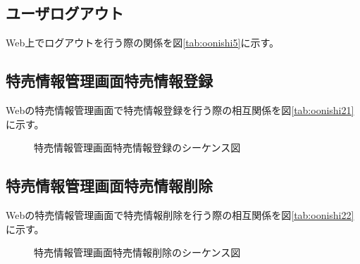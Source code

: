 \documentclass[a4j]{jarticle}
\begin{document}
\subsection{ユーザログアウト}%
Web上でログアウトを行う際の関係を図\ref {tab:oonishi5}に示す。
\subsection{特売情報管理画面特売情報登録}
Webの特売情報管理画面で特売情報登録を行う際の相互関係を図\ref {tab:oonishi21}に示す。
\begin{figure}[hb]
\begin{center}
\caption{特売情報管理画面特売情報登録のシーケンス図}
\label{oonishi21}
\end{center}
\end{figure}
\subsection{特売情報管理画面特売情報削除}
Webの特売情報管理画面で特売情報削除を行う際の相互関係を図\ref {tab:oonishi22}に示す。
\begin{figure}[hb]
\begin{center}
\caption{特売情報管理画面特売情報削除のシーケンス図}
\label{oonishi22}
\end{center}
\end{figure}
\end{document}
